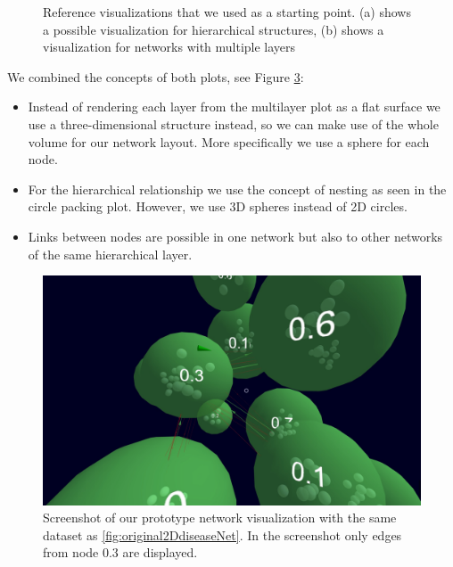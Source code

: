 \begin{figure}[h]
\begin{subfigure}[b]{0.50\columnwidth}
      \label{fig:2dmultilayerVis}
    \end{subfigure}
    \caption[Optional caption for the figure list (often used to abbreviate long captions)]{Reference visualizations that we used as a starting point. (a) shows a possible visualization for hierarchical structures, (b) shows a visualization for networks with multiple layers} %
    \label{fig:referenceVisualizations} 
  \end{figure}

We combined the concepts of both plots, see Figure \ref{fig:conceptSketch}: 
\begin{itemize}
    \item Instead of rendering each layer from the multilayer plot as a flat surface we use a three-dimensional structure instead, so we can make use of the whole volume for our network layout. More specifically we use a sphere for each node.
    \item For the hierarchical relationship we use the concept of nesting as seen in the circle packing plot. However, we use 3D spheres instead of 2D circles. 
    \item Links between nodes are possible in one network but also to other networks of the same hierarchical layer.   
\end{itemize}

\begin{figure}[h]
    \centering
    \includegraphics[width=1\textwidth]{graphics/conceptScreenshot.jpg}
    \caption{Screenshot of our prototype network visualization with the same dataset as \ref{fig:original2DdiseaseNet}. In the screenshot only edges from node 0.3 are displayed.} %
    \label{fig:conceptSketch} 
\end{figure}

